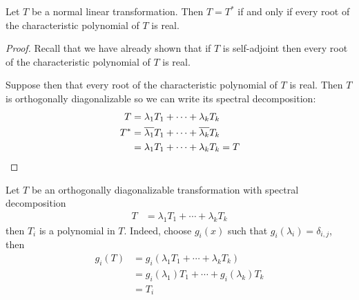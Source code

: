 \begin{theorem}
  Let $T$ be a normal linear transformation. Then $T = T^*$ if and only if
  every root of the characteristic polynomial of $T$ is real.
\end{theorem}
\begin{proof}
  Recall that we have already shown that if $T$ is self-adjoint then every root of the characteristic polynomial of $T$ is real.

  Suppose then that every root of the characteristic polynomial of $T$ is real.
  Then $T$ is orthogonally diagonalizable so we can write its spectral decomposition:
    \begin{align}
      T &= \lambda_1T_1 + \cdots + \lambda_kT_k \\
      T^* &= \overline{\lambda_1}T_1 + \cdots + \overline{\lambda_k}T_k \\
          &= \lambda_1T_1 + \cdots + \lambda_kT_k = T
    \end{align}
\end{proof}

\begin{remark}
  Let $T$ be an orthogonally diagonalizable transformation with spectral decomposition
    \begin{align}
      T &= \lambda_1T_1 + \cdots + \lambda_kT_k
    \end{align}
  then $T_i$ is a polynomial in $T$. Indeed, choose $g_i(x)$ such that $g_i(\lambda_i) = \delta_{i,j}$, then
    \begin{align}
      g_i(T) &= g_i(\lambda_1T_1 + \cdots + \lambda_kT_k) \\
             &= g_i(\lambda_1)T_1 + \cdots + g_i(\lambda_k)T_k \\
             &= T_i
    \end{align}
\end{remark}
